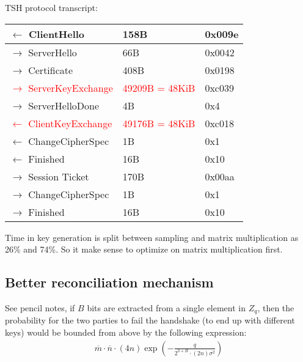 \documentclass[12pt]{article}
\newcommand{\nbar}{\overline{n}}
\newcommand{\mbar}{\overline{m}}
\begin{document}
TSH protocol transcript:
\begin{center}
    \begin{tabular}{| l | l | l |}
    \hline
    $\leftarrow$ ClientHello & 158B & 0x009e\\ \hline
    $\rightarrow$ ServerHello & 66B & 0x0042\\ \hline
    $\rightarrow$ Certificate & 408B & 0x0198\\ \hline
    \textcolor{red}{$\rightarrow$ ServerKeyExchange} & \textcolor{red}{49209B = 48KiB} & 0xc039\\ \hline
    $\rightarrow$ ServerHelloDone & 4B & 0x4\\ \hline
    \textcolor{red}{$\leftarrow$ ClientKeyExchange} & \textcolor{red}{49176B = 48KiB} & 0xc018\\ \hline
    $\leftarrow$ ChangeCipherSpec & 1B & 0x1\\ \hline
    $\leftarrow$ Finished & 16B & 0x10\\ \hline
    $\rightarrow$ Session Ticket & 170B & 0x00aa\\ \hline
    $\rightarrow$ ChangeCipherSpec & 1B & 0x1\\ \hline
    $\rightarrow$ Finished & 16B & 0x10\\ \hline
    \end{tabular}
\end{center}

Time in key generation is split between sampling and matrix multiplication as 26\% and 74\%. So it make sense to optimize on matrix multiplication first.

\subsection{Better reconciliation mechanism}
See pencil notes, if $B$ bits are extracted from a single element in $Z_q$, then the probability for the two parties to fail the handshake (to end up with different keys) would be bounded from above by the following expression:
\begin{align*}
\mbar \cdot \nbar \cdot (4n) \exp\left(-\frac{q}{2^{3 + B} \cdot (2n) \sigma^2}\right)
\end{align*}
\end{document}
